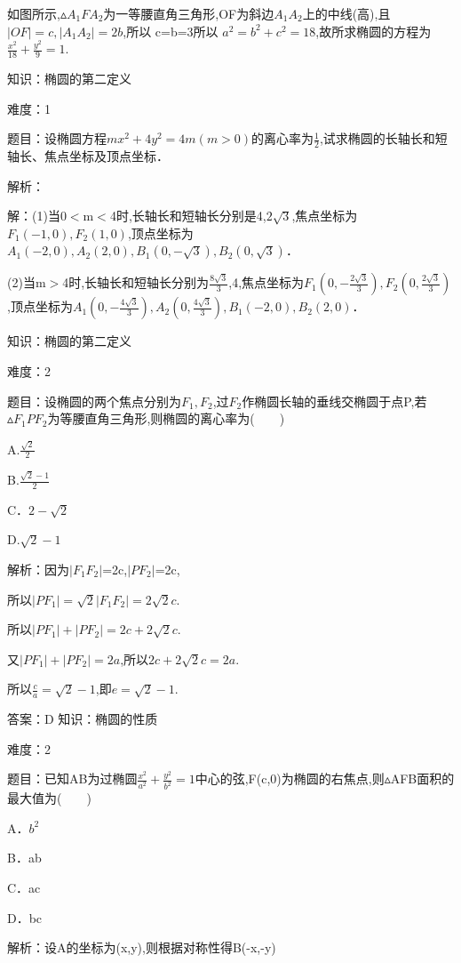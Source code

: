 \documentclass{article} %
\begin{document}
如图所示,${\vartriangle}A_{1}FA_{2}$为一等腰直角三角形,OF为斜边$A_{1}A_{2}$上的中线(高),且$|OF|=c, |A_1A_2|=2b$,所以 c=b=3所以 $a^{2}=b^{2}+c^{2}=18$,故所求椭圆的方程为$\frac{x^2}{18}+\frac{y^2}{9}=1$.



知识：椭圆的第二定义

难度：1

题目：设椭圆方程$mx^{2}+4y^{2}=4m(m{>}0)$的离心率为$\frac{1}{2}$,试求椭圆的长轴长和短轴长、焦点坐标及顶点坐标．

解析：

解：(1)当0${<}$m${<}$4时,长轴长和短轴长分别是4,$2\sqrt{3}$,焦点坐标为$F_{1}(-1,0),F_{2}(1,0)$,顶点坐标为$A_{1}(-2,0),A_{2}(2,0),B_{1}(0,-\sqrt{3}),B_{2}(0,\sqrt{3})$．

(2)当m${>}$4时,长轴长和短轴长分别为$\frac{8\sqrt{3}}{3}$,4,焦点坐标为$F_{1}(0, -\frac{2\sqrt{3}}{3}),F_{2}(0, \frac{2\sqrt{3}}{3})$,顶点坐标为$A_{1}(0,- \frac{4\sqrt{3}}{3}),A_{2}(0,\frac{4\sqrt{3}}{3}),B_{1}(-2,0),B_{2}(2,0)$．



知识：椭圆的第二定义

难度：2

题目：设椭圆的两个焦点分别为$F_{1},F_{2}$,过$F_{2}$作椭圆长轴的垂线交椭圆于点P,若${\vartriangle}F_{1}PF_{2}$为等腰直角三角形,则椭圆的离心率为(　　)

A.$\frac{\sqrt{2}}{2}$   

B.$\frac{\sqrt{2}-1}{2}$

C．$2-\sqrt{2}$

D.$\sqrt{2}-1$

解析：因为$|F_1F_2|$=2c,$|PF_2|$=2c,

所以$|PF_1|=\sqrt{2}|F_1F_2|=2\sqrt{2}c$.

所以$|PF_1|+|PF_2|=2c+2\sqrt{2}c$.

又$|PF_1|+|PF_2|=2a$,所以$2c+2\sqrt{2}c=2a$.

所以$\frac{c}{a}=\sqrt{2}-1$,即$e=\sqrt{2}-1$.

答案：D
知识：椭圆的性质

难度：2

题目：已知AB为过椭圆$\frac{x^2}{a^2}+\frac{y^2}{b^2}=1$中心的弦,F(c,0)为椭圆的右焦点,则${\vartriangle}$AFB面积的最大值为(　　)

A．$b^{2}$  

B．ab  

C．ac  

D．bc

解析：设A的坐标为(x,y),则根据对称性得B(-x,-y)
\end{document}
